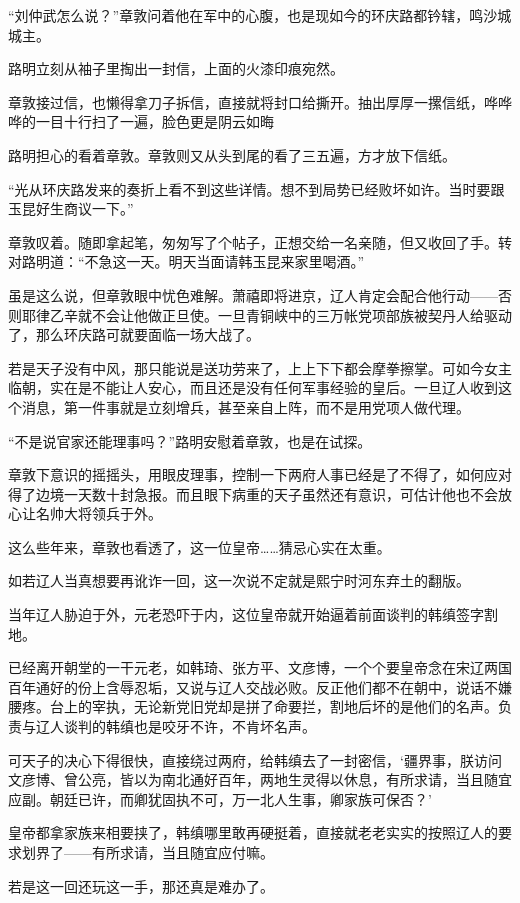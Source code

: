 “刘仲武怎么说？”章敦问着他在军中的心腹，也是现如今的环庆路都钤辖，鸣沙城城主。

路明立刻从袖子里掏出一封信，上面的火漆印痕宛然。

章敦接过信，也懒得拿刀子拆信，直接就将封口给撕开。抽出厚厚一摞信纸，哗哗哗的一目十行扫了一遍，脸色更是阴云如晦

路明担心的看着章敦。章敦则又从头到尾的看了三五遍，方才放下信纸。

“光从环庆路发来的奏折上看不到这些详情。想不到局势已经败坏如许。当时要跟玉昆好生商议一下。”

章敦叹着。随即拿起笔，匆匆写了个帖子，正想交给一名亲随，但又收回了手。转对路明道：“不急这一天。明天当面请韩玉昆来家里喝酒。”

虽是这么说，但章敦眼中忧色难解。萧禧即将进京，辽人肯定会配合他行动——否则耶律乙辛就不会让他做正旦使。一旦青铜峡中的三万帐党项部族被契丹人给驱动了，那么环庆路可就要面临一场大战了。

若是天子没有中风，那只能说是送功劳来了，上上下下都会摩拳擦掌。可如今女主临朝，实在是不能让人安心，而且还是没有任何军事经验的皇后。一旦辽人收到这个消息，第一件事就是立刻增兵，甚至亲自上阵，而不是用党项人做代理。

“不是说官家还能理事吗？”路明安慰着章敦，也是在试探。

章敦下意识的摇摇头，用眼皮理事，控制一下两府人事已经是了不得了，如何应对得了边境一天数十封急报。而且眼下病重的天子虽然还有意识，可估计他也不会放心让名帅大将领兵于外。

这么些年来，章敦也看透了，这一位皇帝……猜忌心实在太重。

如若辽人当真想要再讹诈一回，这一次说不定就是熙宁时河东弃土的翻版。

当年辽人胁迫于外，元老恐吓于内，这位皇帝就开始逼着前面谈判的韩缜签字割地。

已经离开朝堂的一干元老，如韩琦、张方平、文彦博，一个个要皇帝念在宋辽两国百年通好的份上含辱忍垢，又说与辽人交战必败。反正他们都不在朝中，说话不嫌腰疼。台上的宰执，无论新党旧党却是拼了命要拦，割地后坏的是他们的名声。负责与辽人谈判的韩缜也是咬牙不许，不肯坏名声。

可天子的决心下得很快，直接绕过两府，给韩缜去了一封密信，‘疆界事，朕访问文彦博、曾公亮，皆以为南北通好百年，两地生灵得以休息，有所求请，当且随宜应副。朝廷已许，而卿犹固执不可，万一北人生事，卿家族可保否？’

皇帝都拿家族来相要挟了，韩缜哪里敢再硬挺着，直接就老老实实的按照辽人的要求划界了——有所求请，当且随宜应付嘛。

若是这一回还玩这一手，那还真是难办了。

